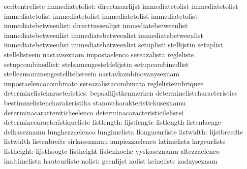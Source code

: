                                  ecritentreliste
                 immediatetolist: directnaarlijst                  immediatetolist
                                  immediatetolist                  immediatetolist
                                  immediatetolist                  immediatetolist
                                  immediatetolist
            immediatebetweenlist: directtussenlijst                immediatebetweenlist
                                  immediatebetweenlist             immediatebetweenlist
                                  immediatebetweenlist             immediatebetweenlist
                                  immediatebetweenlist
                       setuplist: stellijstin                      setuplist
                                  stellelisteein                   nastavseznam
                                  impostaelenco                    seteazalista
                                  regleliste
               setupcombinedlist: stelsamengesteldelijstin         setupcombinedlist
                                  stellezusammengestelltelisteein  nastavkombinovanyseznam
                                  impostaelencocombinato           seteazalistacombinata
                                  reglelisteimbriquee
    determinelistcharacteristics: bepaallijstkenmerken             determinelistcharacteristics
                                  bestimmelistencharakeristika     stanovcharakteristickuseznamu
                                  determinacarattersticheelenco    determinacaracteristicilelistei
                                  determinecaracteristiqueliste
                      listlength: lijstlengte                      listlength
                                  listenlaenge                     delkaseznamu
                                  lunghezzaelenco                  lungimelista
                                  llongueurliste
                       listwidth: lijstbreedte                     listwidth
                                  listenbreite                     sirkaseznamu
                                  ampiezzaelenco                   latimelista
                                  largeurliste
                      listheight: lijsthoogte                      listheight
                                  listenhoehe                      vyskaseznamu
                                  altezzaelenco                    inaltimelista
                                  hauteurliste
                          nolist: geenlijst                        nolist
                                  keineliste                       zadnyseznam
